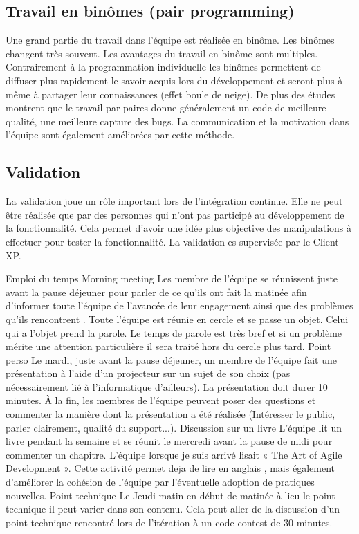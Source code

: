 \documentclass{article}
\begin{document}
\subsection{Travail en binômes (pair programming)}
Une grand partie du travail dans l'équipe est réalisée en binôme. Les binômes changent très souvent. Les avantages du travail en binôme sont multiples. Contrairement à la programmation individuelle les binômes permettent de diffuser plus rapidement le savoir acquis lors du développement et seront plus à même à partager leur connaissances (effet boule de neige). De plus des études montrent que le travail par paires donne généralement un code de meilleure qualité, une meilleure capture des bugs. La communication et la motivation dans l'équipe sont également améliorées par cette méthode.


\subsection{Validation}
La validation joue un rôle important lors de l'intégration continue. Elle ne peut être réalisée que par des personnes qui n'ont pas participé au développement de la fonctionnalité. Cela permet d'avoir une idée plus objective des manipulations à effectuer pour tester la fonctionnalité. La validation es supervisée par le Client XP.


Emploi du temps
Morning meeting
Les membre de l'équipe se réunissent juste avant la pause déjeuner pour parler de ce qu'ils ont fait la matinée afin d'informer toute l'équipe de l'avancée de leur engagement ainsi que des problèmes qu'ils rencontrent . Toute l'équipe est réunie en cercle et se passe un objet. Celui qui a l'objet prend la parole. Le temps de parole est très bref et si un problème mérite une attention particulière il sera traité hors du cercle plus tard.
Point perso
Le mardi, juste avant la pause déjeuner, un membre de l'équipe fait une présentation à l'aide d'un projecteur sur un sujet de son choix (pas nécessairement lié à l'informatique d'ailleurs). La présentation doit durer 10 minutes. \`A la fin, les membres de l'équipe peuvent poser des questions et commenter la manière dont la présentation a été réalisée (Intéresser le public, parler clairement, qualité du support...).
Discussion sur un livre
L'équipe lit un livre pendant la semaine et se réunit le mercredi avant la pause de midi pour commenter un chapitre. L'équipe lorsque je suis arrivé lisait « The Art of Agile Development ». Cette activité permet deja de lire en anglais , mais également d'améliorer la cohésion de l'équipe par l'éventuelle adoption de pratiques nouvelles.
Point technique
Le Jeudi matin en début de matinée à lieu le point technique il peut varier dans son contenu. Cela peut aller de la discussion d'un point technique rencontré lors de l'itération à un code contest de 30 minutes.
\end{document}
